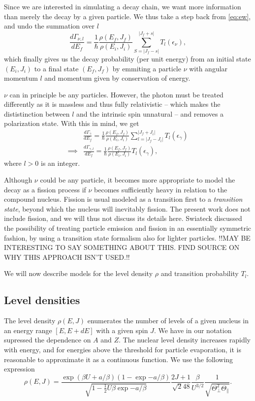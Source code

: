 Since we are interested in simulating a decay chain, we want more information than merely the decay by a given particle. We thus take a step back from \eqref{eq:ew}, and undo the summation over $l$
\begin{equation}
\frac{d\Gamma_{\nu,l}}{dE_f} = \frac{1}{\hbar} \frac{\rho(E_f,J_f)}{\rho(E_i,J_i)} \sum_{S=|J_f-s|}^{|J_f+s|} T_l(\epsilon_\nu),\label{eq:ew}
\end{equation}
which finally gives us the decay probability (per unit energy) from an initial state $(E_i,J_i)$ to a final state $(E_f,J_f)$ by emmiting a particle $\nu$ with angular momentum $l$ and momentum given by conservation of energy.

$\nu$ can in principle be any particles. However, the photon must be treated differently as it is massless and thus fully relativistic -- which makes the dististinction between $l$ and the intrinsic spin unnatural -- and removes a polarization state. With this in mind, we get
\begin{align}
&\frac{d\Gamma_{\gamma}}{dE_f} = \frac{1}{\hbar} \frac{\rho(E_f,J_f)}{\rho(E_i,J_i)} \sum_{l=|J_f-J_i|}^{|J_f+J_i|} T_l(\epsilon_\gamma) \\
\implies & \frac{d\Gamma_{\gamma,l}}{dE_f} = \frac{1}{\hbar} \frac{\rho(E_f,J_f)}{\rho(E_i,J_i)} T_l(\epsilon_\gamma),
\end{align}
where $l>0$ is an integer.

Although $\nu$ could be any particle, it becomes more appropriate to model the decay as a fission process if $\nu$ becomes sufficiently heavy in relation to the compound nucleus. Fission is usual modeled as a transition first to a \emph{transition state}, beyond which the nucleus will inevitably fission\cite{krane:book}. The present work does not include fission, and we will thus not discuss its details here. Swiateck discussed the possibility of treating particle emission and fission in an essentially symmetric fashion, by using a transition state formalism also for lighter particles\cite{swiatecki:1983:art}. !!MAY BE INTERESTING TO SAY SOMETHING ABOUT THIS. FIND SOURCE ON WHY THIS APPROACH ISN'T USED.!!

We will now describe models for the level density $\rho$ and transition probability $T_l$.

\subsection{Level densities}
The level density $\rho(E,J)$ enumerates the number of levels of a given nucleus in an energy range $[E,E+dE]$ with a given spin $J$. We have in our notation supressed the dependence on $A$ and $Z$. The nuclear level density increases rapidly with energy, and for energies above the threshold for particle evaporation, it is reasonable to approximate it as a continuous function.
We use the following expression
\begin{equation}
\rho(E,J) = \frac{\exp{(\beta U + a/\beta)}(1-\exp{-a/\beta})}{\sqrt{1-\tfrac{1}{2}U\beta\exp{-a/\beta}}} \frac{2J+1}{\sqrt{2}48} \frac{\beta}{U^{3/2}} \frac{1}{\sqrt{\Theta_\perp^2 \Theta_\parallel}}.\label{eq:rho}
\end{equation}

